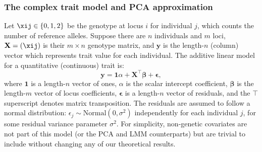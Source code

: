 \documentclass[11pt]{article}
\begin{document}
\subsubsection{The complex trait model and PCA approximation}

Let $\xij \in \{ 0, 1, 2 \}$ be the genotype at locus $i$ for individual $j$, which counts the number of reference alleles.
Suppose there are $n$ individuals and $m$ loci,
$\mathbf{X} = ( \xij )$ is their $m \times n$ genotype matrix, and
$\mathbf{y}$ is the length-$n$ (column) vector which represents trait value for each individual.
The additive linear model for a quantitative (continuous) trait is:
\begin{equation}
  \label{eq:trait}
  \mathbf{y}
  =
  \mathbf{1} \alpha + \mathbf{X}^\intercal \boldsymbol{\beta} + \boldsymbol{\epsilon}
  ,
\end{equation}
where
$\mathbf{1}$ is a length-$n$ vector of ones,
$\alpha$ is the scalar intercept coefficient,
$\boldsymbol{\beta}$ is the length-$m$ vector of locus coefficients,
$\boldsymbol{\epsilon}$ is a length-$n$ vector of residuals,
and the $\intercal$ superscript denotes matrix transposition.
The residuals are assumed to follow a normal distribution: $\epsilon_j \sim \text{Normal}(0, \sigma^2)$ independently for each individual $j$, for some residual variance parameter $\sigma^2$.
For simplicity, non-genetic covariates are not part of this model (or the PCA and LMM counterparts) but are trivial to include without changing any of our theoretical results.
\end{document}
